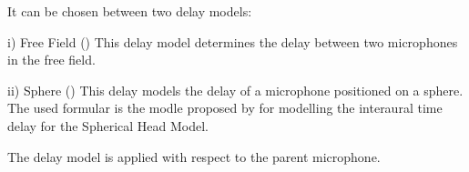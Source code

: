It can be chosen between two delay models:

i) Free Field ()
This delay model determines the delay between two microphones in the free field.

ii) Sphere ()
This delay models the delay of a microphone positioned on a sphere. The used formular is
the modle proposed by \citet{BrownDuda} for modelling the interaural time delay for the
Spherical Head Model.

The delay model is applied with respect to the parent microphone.


